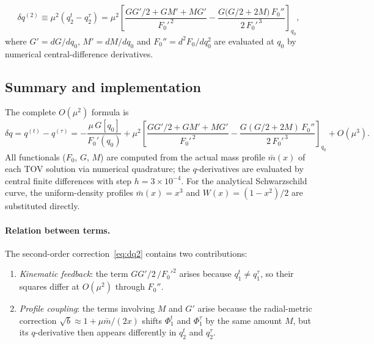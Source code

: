 \begin{equation}
    \delta q^{(2)} \equiv \mu^2(q_2^t - q_2^\tau) = \mu^2
    \left[
        \frac{G G'/2 + G M' + M G'}{F_0'^{\,2}}
        -\frac{G\bigl(G/2 + 2M\bigr)\,F_0''}{2\,F_0'^{\,3}}
    \right]_{q_0},
    \label{eq:dq2}
\end{equation}
where $G' = dG/dq_0$, $M' = dM/dq_0$ and $F_0'' = d^2F_0/dq_0^2$ are
evaluated at $q_0$ by numerical central-difference derivatives.

\subsection{Summary and implementation}

The complete $O(\mu^2)$ formula is
\begin{equation}
    \boxed{
    \delta q = q^{(t)} - q^{(\tau)}
    = -\frac{\mu\,G[q_0]}{F_0'(q_0)}
    + \mu^2
      \left[
          \frac{GG'/2 + GM' + MG'}{F_0'^{\,2}}
          - \frac{G(G/2+2M)\,F_0''}{2\,F_0'^{\,3}}
      \right]_{q_0}
      + O(\mu^3).
    }
    \label{eq:dq_nlo}
\end{equation}
All functionals ($F_0$, $G$, $M$) are computed from the actual mass profile
$\bar{m}(x)$ of each TOV solution via numerical quadrature; the $q$-derivatives
are evaluated by central finite differences with step $h = 3\times10^{-4}$.
For the analytical Schwarzschild curve, the uniform-density profiles
$\bar{m}(x) = x^3$ and $W(x) = (1-x^2)/2$ are substituted directly.

\paragraph{Relation between terms.}
The second-order correction~\eqref{eq:dq2} contains two contributions:
\begin{enumerate}
    \item \emph{Kinematic feedback}: the term $G G'/2\,/F_0'^2$ arises because
          $q_1^t \neq q_1^\tau$, so their squares differ at $O(\mu^2)$ through
          $F_0''$.
    \item \emph{Profile coupling}: the terms involving $M$ and $G'$ arise because
          the radial-metric correction $\sqrt{b} \approx 1 + \mu\bar{m}/(2x)$
          shifts $\Phi_1^t$ and $\Phi_1^\tau$ by the same amount $M$, but its
          $q$-derivative then appears differently in $q_2^t$ and $q_2^\tau$.
\end{enumerate}


